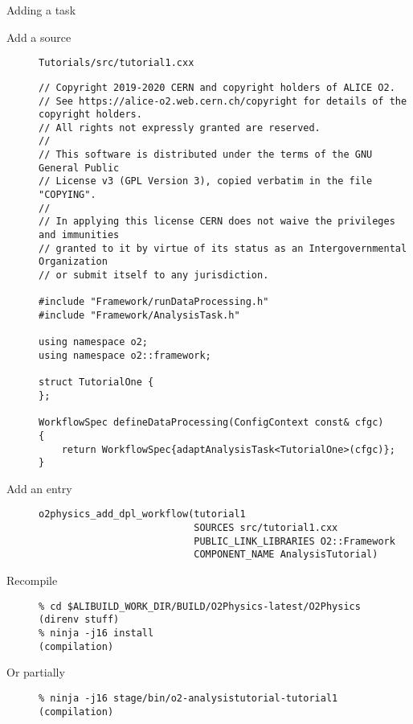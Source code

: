 \documentclass[10pt,lualatex,xcolor={table,svgnames},{hyperref={bookmarks=true,linktoc=all}},aspectratio=169]{beamer}
\begin{document}
\begin{frame}{Adding a task}
    \begin{description}
        \item[Add a source]
            \texttt{Tutorials/src/tutorial1.cxx}
            \begin{verbatim}
// Copyright 2019-2020 CERN and copyright holders of ALICE O2.
// See https://alice-o2.web.cern.ch/copyright for details of the copyright holders.
// All rights not expressly granted are reserved.
//
// This software is distributed under the terms of the GNU General Public
// License v3 (GPL Version 3), copied verbatim in the file "COPYING".
//
// In applying this license CERN does not waive the privileges and immunities
// granted to it by virtue of its status as an Intergovernmental Organization
// or submit itself to any jurisdiction.

#include "Framework/runDataProcessing.h"
#include "Framework/AnalysisTask.h"

using namespace o2;
using namespace o2::framework;

struct TutorialOne {
};

WorkflowSpec defineDataProcessing(ConfigContext const& cfgc)
{
    return WorkflowSpec{adaptAnalysisTask<TutorialOne>(cfgc)};
}
            \end{verbatim}
        \item[Add an entry]
        \begin{verbatim}
o2physics_add_dpl_workflow(tutorial1
                           SOURCES src/tutorial1.cxx
                           PUBLIC_LINK_LIBRARIES O2::Framework
                           COMPONENT_NAME AnalysisTutorial)
        \end{verbatim}
    \item[Recompile]
    \begin{verbatim}
% cd $ALIBUILD_WORK_DIR/BUILD/O2Physics-latest/O2Physics
(direnv stuff)
% ninja -j16 install
(compilation)
    \end{verbatim}
\item[Or partially]
\begin{verbatim}
% ninja -j16 stage/bin/o2-analysistutorial-tutorial1
(compilation)
\end{verbatim}
    \end{description}
\end{frame}
\end{document}
